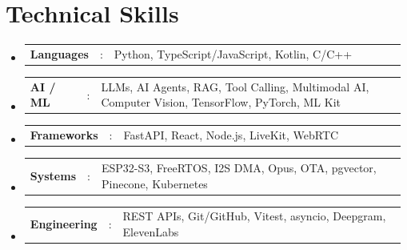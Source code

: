 \documentclass[a4paper,11pt]{article}
\newcommand{\resumeHeadingListStart}{\begin{itemize}[leftmargin=0.15in,label={},itemsep=2pt,topsep=0pt,parsep=0pt,partopsep=0pt]}
\newcommand{\resumeHeadingListEnd}{\end{itemize}}
\newcommand{\resumeSectionType}[3]{%
\item
\begin{tabular*}{0.96\textwidth}[t]{p{0.15\linewidth}p{0.02\linewidth}p{0.81\linewidth}}
\textbf{#1} & #2 & #3
\end{tabular*}\vspace{-2pt}}
\begin{document}
\section{Technical Skills}
\resumeHeadingListStart{}
  \resumeSectionType{Languages}{:}{Python, TypeScript/JavaScript, Kotlin, C/C++}
  \resumeSectionType{AI / ML}{:}{LLMs, AI Agents, RAG, Tool Calling, Multimodal AI, Computer Vision, TensorFlow, PyTorch, ML Kit}
  \resumeSectionType{Frameworks}{:}{FastAPI, React, Node.js, LiveKit, WebRTC}
  \resumeSectionType{Systems}{:}{ESP32-S3, FreeRTOS, I2S DMA, Opus, OTA, pgvector, Pinecone, Kubernetes}
  \resumeSectionType{Engineering}{:}{REST APIs, Git/GitHub, Vitest, asyncio, Deepgram, ElevenLabs}
\resumeHeadingListEnd{}
\end{document}
